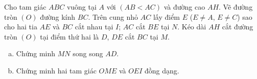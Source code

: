 \begin{ex}%
   Cho tam giác $ABC$ vuông tại $A$ với  $\left(AB<AC\right)$ và đường cao $AH$. Vẽ đường tròn $(O)$ đường kính $BC$. Trên cung nhỏ $AC$ lấy điểm $E$ ($E\ne A$, $E\ne C$) sao cho hai tia $AE$ và $BC$ cắt nhau tại $I$; $AC$ cắt $BE$ tại $N$. Kéo dài $AH$ cắt đường tròn $(O)$ tại điểm thứ hai là $D$, $DE$ cắt $BC$ tại $M$.
\begin{enumerate}[a)]
	\item Chứng minh $MN$ song song $AD$.
	\item Chứng minh hai tam giác $OME$ và $OEI$ đồng dạng.
\end{enumerate}
\loigiai
    {
 }
\end{ex}
